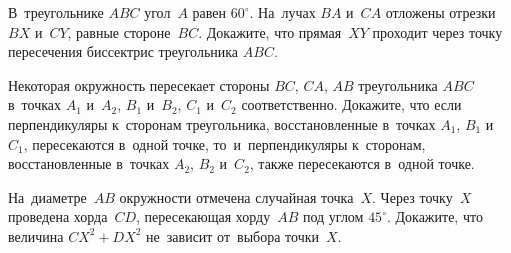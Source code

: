 \begin{problems}
\item
В~треугольнике $ABC$ угол~$A$ равен $60^\circ$.
На~лучах $BA$ и~$CA$ отложены отрезки $BX$ и~$CY$, равные стороне~$BC$.
Докажите, что прямая~$XY$ проходит через точку пересечения биссектрис
треугольника $ABC$.

\item
Некоторая окружность пересекает стороны $BC$, $CA$, $AB$ треугольника $ABC$
в~точках $A_1$ и~$A_2$, $B_1$ и~$B_2$, $C_1$ и~$C_2$ соответственно.
Докажите, что если перпендикуляры к~сторонам треугольника, восстановленные
в~точках $A_1$, $B_1$ и~$C_1$, пересекаются в~одной точке, то~и~перпендикуляры
к~сторонам, восстановленные в~точках $A_2$, $B_2$ и~$C_2$, также пересекаются
в~одной точке.

\item
На~диаметре~$AB$ окружности отмечена случайная точка~$X$.
Через точку~$X$ проведена хорда~$CD$, пересекающая хорду~$AB$ под углом
$45^{\circ}$.
Докажите, что величина $CX^2 + DX^2$ не~зависит от~выбора точки~$X$.


\end{problems}

